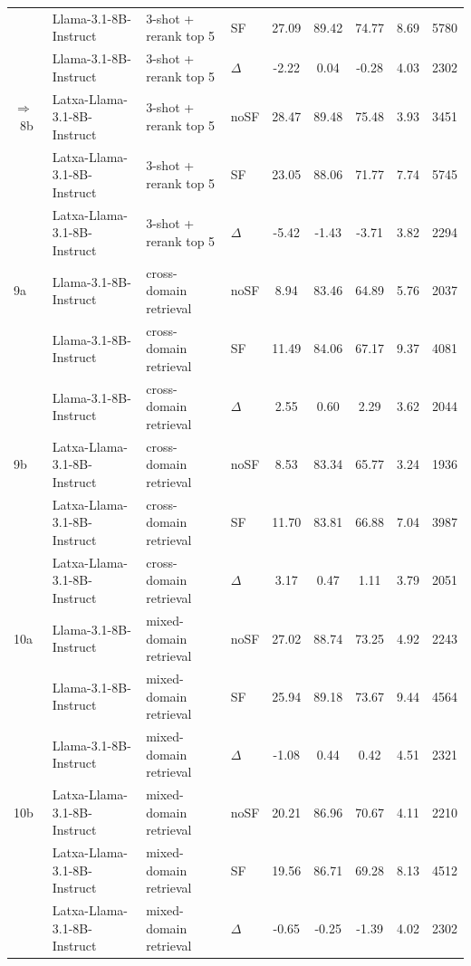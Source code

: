 \begin{scriptsize}
\begin{longtable}{l l l l c c c c c}
 & Llama-3.1-8B-Instruct & 3-shot + rerank top 5 & SF & 27.09 & 89.42 & 74.77 & 8.69 & 5780 \\
 & Llama-3.1-8B-Instruct & 3-shot + rerank top 5 & $\Delta$ & -2.22 & 0.04 & -0.28 & 4.03 & 2302 \\
\rowcolor{tabhighlight}$\Rightarrow$~8b & Latxa-Llama-3.1-8B-Instruct & 3-shot + rerank top 5 & noSF & 28.47 & 89.48 & 75.48 & 3.93 & 3451 \\
 & Latxa-Llama-3.1-8B-Instruct & 3-shot + rerank top 5 & SF & 23.05 & 88.06 & 71.77 & 7.74 & 5745 \\
 & Latxa-Llama-3.1-8B-Instruct & 3-shot + rerank top 5 & $\Delta$ & -5.42 & -1.43 & -3.71 & 3.82 & 2294 \\
\dmidrule
9a & Llama-3.1-8B-Instruct & cross-domain retrieval & noSF & 8.94 & 83.46 & 64.89 & 5.76 & 2037 \\
 & Llama-3.1-8B-Instruct & cross-domain retrieval & SF & 11.49 & 84.06 & 67.17 & 9.37 & 4081 \\
 & Llama-3.1-8B-Instruct & cross-domain retrieval & $\Delta$ & 2.55 & 0.60 & 2.29 & 3.62 & 2044 \\
9b & Latxa-Llama-3.1-8B-Instruct & cross-domain retrieval & noSF & 8.53 & 83.34 & 65.77 & 3.24 & 1936 \\
 & Latxa-Llama-3.1-8B-Instruct & cross-domain retrieval & SF & 11.70 & 83.81 & 66.88 & 7.04 & 3987 \\
 & Latxa-Llama-3.1-8B-Instruct & cross-domain retrieval & $\Delta$ & 3.17 & 0.47 & 1.11 & 3.79 & 2051 \\
\dmidrule
10a & Llama-3.1-8B-Instruct & mixed-domain retrieval & noSF & 27.02 & 88.74 & 73.25 & 4.92 & 2243 \\
 & Llama-3.1-8B-Instruct & mixed-domain retrieval & SF & 25.94 & 89.18 & 73.67 & 9.44 & 4564 \\
 & Llama-3.1-8B-Instruct & mixed-domain retrieval & $\Delta$ & -1.08 & 0.44 & 0.42 & 4.51 & 2321 \\
10b & Latxa-Llama-3.1-8B-Instruct & mixed-domain retrieval & noSF & 20.21 & 86.96 & 70.67 & 4.11 & 2210 \\
 & Latxa-Llama-3.1-8B-Instruct & mixed-domain retrieval & SF & 19.56 & 86.71 & 69.28 & 8.13 & 4512 \\
 & Latxa-Llama-3.1-8B-Instruct & mixed-domain retrieval & $\Delta$ & -0.65 & -0.25 & -1.39 & 4.02 & 2302 \\
\end{longtable}
\end{scriptsize}
